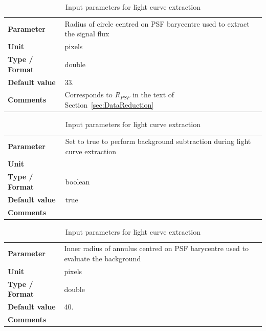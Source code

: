 \documentclass[11pt]{article}      %
\def\HCode#1{}
\def\htmlanchor#1{\HCode{<a id="#1"></a>}}
\begin{document}
\begin{table}[hb]
  \caption{Input parameters for light curve extraction}


  \htmlanchor{radius_psf}
  \begin{tabular}{| l | p{13cm} |}
    \hline 
    {\bf Parameter} & Radius of circle centred on PSF barycentre used to extract the signal flux\\
    {\bf Unit} & pixels \\
    {\bf Type / Format} & double \\
    {\bf Default value} & 33.\\
    {\bf Comments} & Corresponds to $R_{PSF}$ in the text of Section~\ref{sec:DataReduction}\\
    \hline
  \end{tabular}
  \bigskip

  \htmlanchor{subtractBackground}
  \begin{tabular}{| l | p{13cm} |}
    \hline 
    {\bf Parameter} & Set to true to perform background subtraction during light curve extraction\\
    {\bf Unit} & \\
    {\bf Type / Format} & boolean \\
    {\bf Default value} & true\\
    {\bf Comments} & \\
    \hline
  \end{tabular}
  \bigskip

  \htmlanchor{radius_bkgInner}
  \begin{tabular}{| l | p{13cm} |}
    \hline 
    {\bf Parameter} & Inner radius of annulus centred on PSF barycentre used to evaluate the background\\
    {\bf Unit} & pixels \\
    {\bf Type / Format} & double \\
    {\bf Default value} & 40.\\
    {\bf Comments} & \\
    \hline
  \end{tabular}
  \bigskip


\end{table}
\end{document}
